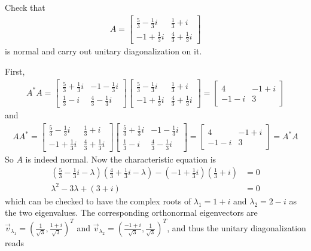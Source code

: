 \begin{exmp}
\label{exmp:unitarydiagnormal}
Check that
\begin{align*}
A = 
\begin{bmatrix}
\frac{5}{3}-\frac{1}{3}i &\frac{1}{3}+i \\ 
-1+\frac{1}{3}i & \frac{4}{3}+\frac{1}{3}i
\end{bmatrix}
\end{align*}
is normal and carry out unitary diagonalization on it.
\end{exmp}
\begin{solution}
First,
\begin{align*}
A^* A=
\begin{bmatrix}
\frac{5}{3}+\frac{1}{3}i & -1-\frac{1}{3}i\\ 
\frac{1}{3}-i & \frac{4}{3}-\frac{1}{3}i
\end{bmatrix}
\begin{bmatrix}
\frac{5}{3}-\frac{1}{3}i &\frac{1}{3}+i \\ 
-1+\frac{1}{3}i & \frac{4}{3}+\frac{1}{3}i
\end{bmatrix} =
\begin{bmatrix}
4 & -1+i \\
-1-i & 3
\end{bmatrix}
\end{align*}
and
\begin{align*}
A A^* =
\begin{bmatrix}
\frac{5}{3}-\frac{1}{3}i & \frac{1}{3}+i \\ 
-1+\frac{1}{3}i & \frac{4}{3}+\frac{1}{3}i
\end{bmatrix}
\begin{bmatrix}
\frac{5}{3}+\frac{1}{3}i & -1-\frac{1}{3}i \\ 
\frac{1}{3}-i & \frac{4}{3}-\frac{1}{3}i
\end{bmatrix} =
\begin{bmatrix}
4 & -1+i \\
-1-i & 3
\end{bmatrix} = A^* A
\end{align*}
So $A$ is indeed normal. Now the characteristic equation is
\begin{align*}
(\frac{5}{3}-\frac{1}{3}i-\lambda)(\frac{4}{3}+\frac{1}{3}i-\lambda) - (-1+\frac{1}{3}i)(\frac{1}{3}+i) &= 0 \\
\lambda^2 - 3\lambda + (3+i) &= 0 
\end{align*}
which can be checked to have the complex roots of $\lambda_1 = 1+i$ and $\lambda_2 = 2-i$ as the two eigenvalues. The corresponding orthonormal eigenvectors are $\vec{v}_{\lambda_1} = (\frac{1}{\sqrt{3}}, \frac{1+i}{\sqrt{3}})^T$ and $\vec{v}_{\lambda_2} = (\frac{-1+i}{\sqrt{3}}, \frac{1}{\sqrt{3}})^T$, and thus the unitary diagonalization reads

\end{solution}
